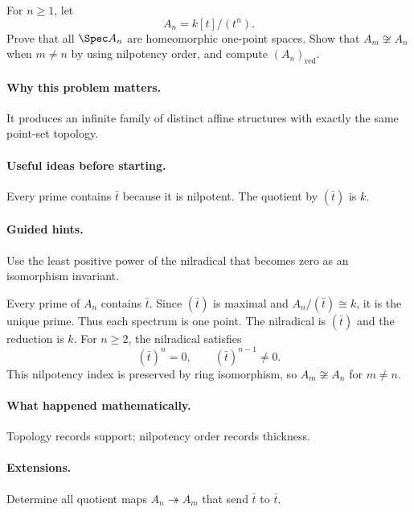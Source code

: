 \begin{problem}
For $n\ge1$, let
\[
A_n=k[t]/(t^n).
\]
Prove that all $\Spec A_n$ are homeomorphic one-point spaces.  Show that $A_m\not\cong A_n$
when $m\ne n$ by using nilpotency order, and compute $(A_n)_{\mathrm{red}}$.
\end{problem}
\paragraph{Why this problem matters.}
It produces an infinite family of distinct affine structures with exactly the same point-set
topology.
\paragraph{Useful ideas before starting.}
Every prime contains $\bar t$ because it is nilpotent.  The quotient by $(\bar t)$ is $k$.
\paragraph{Guided hints.}
Use the least positive power of the nilradical that becomes zero as an isomorphism invariant.
\begin{solution}
Every prime of $A_n$ contains $\bar t$.  Since $(\bar t)$ is maximal and
$A_n/(\bar t)\cong k$, it is the unique prime.  Thus each spectrum is one point.  The
nilradical is $(\bar t)$ and the reduction is $k$.
For $n\ge2$, the nilradical satisfies
\[
(\bar t)^n=0,\qquad (\bar t)^{n-1}\ne0.
\]
This nilpotency index is preserved by ring isomorphism, so $A_m\not\cong A_n$ for $m\ne n$.
\end{solution}
\paragraph{What happened mathematically.}
Topology records support; nilpotency order records thickness.
\paragraph{Extensions.}
Determine all quotient maps $A_n\twoheadrightarrow A_m$ that send $\bar t$ to $\bar t$.

